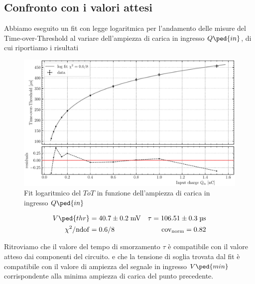 \documentclass[10pt, a4paper, italian]{article}
\begin{document}
\subsection{Confronto con i valori attesi}
Abbiamo eseguito un fit con legge logaritmica per l'andamento delle misure
del Time-over-Threshold al variare dell'ampiezza di carica in ingresso
$Q\ped{in}$, di cui riportiamo i risultati
\begin{figure}[htbp]
    \centering
	\includegraphics[scale=0.7]{logfit}
    \caption{Fit logaritmico del $ToT$ in funzione dell'ampiezza di carica in
    ingresso $Q\ped{in}$ \label{fig: logfit}}
\end{figure}
\begin{align*}
V\ped{thr} &= 40.7 \pm 0.2 \; \si{m\V}
&\tau = 106.51 \pm 0.3 \; \si{\micro\s} \\
\chi^2/\mathrm{ndof} &= 0.6/8 &\mathrm{cov_{norm}} = 0.82
\end{align*}

Ritroviamo che il valore del tempo di smorzamento $\tau$ è compatibile con il
valore atteso dai componenti del circuito.
e che la tensione di soglia trovata dal fit è compatibile con il valore di
ampiezza del segnale in ingresso $V\ped{min}$ corrispondente alla minima
ampiezza di carica del punto precedente.

\end{document}
